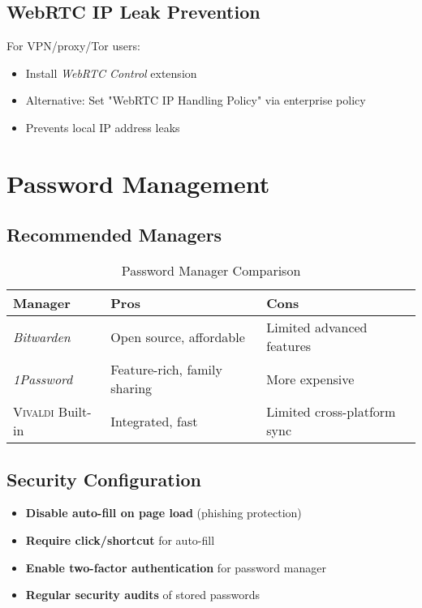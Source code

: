 \documentclass[11pt,a4paper,oneside]{book}
\newcommand{\vivaldi}{\textsc{Vivaldi}}
\newcommand{\extension}[1]{\textit{\color{primaryblue}#1}}
\begin{document}
\subsection{WebRTC IP Leak Prevention}

For VPN/proxy/Tor users:

\begin{itemize}
    \item Install \extension{WebRTC Control} extension
    \item Alternative: Set "WebRTC IP Handling Policy" via enterprise policy
    \item Prevents local IP address leaks
\end{itemize}

\section{Password Management}

\subsection{Recommended Managers}

\begin{table}[h]
\centering
\begin{tabular}{@{}lll@{}}
\toprule
\textbf{Manager} & \textbf{Pros} & \textbf{Cons} \\
\midrule
\extension{Bitwarden} & Open source, affordable & Limited advanced features \\
\extension{1Password} & Feature-rich, family sharing & More expensive \\
\vivaldi{} Built-in & Integrated, fast & Limited cross-platform sync \\
\bottomrule
\end{tabular}
\caption{Password Manager Comparison}
\end{table}

\subsection{Security Configuration}

\begin{itemize}
    \item \textbf{Disable auto-fill on page load} (phishing protection)
    \item \textbf{Require click/shortcut} for auto-fill
    \item \textbf{Enable two-factor authentication} for password manager
    \item \textbf{Regular security audits} of stored passwords
\end{itemize}
\end{document}
